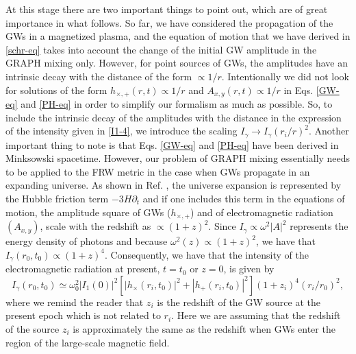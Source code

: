 \documentclass[a4paper,11pt]{article}
\begin{document}
At this stage there are two important things to point out, which are of great importance in what follows. So far, we have considered the propagation of the GWs in a magnetized plasma, and the equation of motion that we have derived in \eqref{schr-eq} takes into account the change of the initial GW amplitude in the GRAPH mixing only. However, for point sources of GWs, the amplitudes have an intrinsic decay with the distance of the form $\propto 1/r$. Intentionally we did not look for solutions of the form $h_{\times, +}(r, t)\propto 1/r$ and $A_{x, y}(r, t)\propto 1/r$ in Eqs. \eqref{GW-eq} and \eqref{PH-eq} in order to simplify our formalism as much as possible. So,  to include the intrinsic decay of the amplitudes with the distance in the expression of the intensity given in \eqref{I1-4}, we introduce the scaling $I_\gamma\rightarrow I_\gamma (r_i/r)^2$. Another important thing to note is that Eqs. \eqref{GW-eq} and \eqref{PH-eq} have been derived in  Minksowski spacetime. However, our problem of GRAPH mixing essentially needs to be applied to the FRW metric in the case when GWs propagate in an expanding universe. As shown in Ref. \cite{Ejlli:2016avx}, the universe expansion is represented by the Hubble friction term $-3 H\partial_t$ and if one includes this term in the equations of motion, the amplitude square of GWs ($h_{\times, +}$) and of electromagnetic radiation $(A_{x, y})$, scale with the redshift as $\propto (1+z)^{2}$. Since $I_\gamma\propto \omega^2 |A|^2$ represents the energy density of photons and because $\omega^2(z) \propto (1+z)^2$, we have that $I_\gamma(r_0, t_0) \propto (1+z)^4$. Consequently, we have that the intensity of the electromagnetic radiation at present, $t=t_0$ or $z=0$, is given by 
\begin{equation}\label{I1-5}
I_\gamma(r_0, t_0) \simeq \omega_0^2 |I_1(0)|^2 \left[  | h_\times(r_i, t_0)|^2 + | h_+(r_i, t_0)|^2 \right](1+z_i)^4(r_i/r_0)^2,
\end{equation}
where we remind the reader that $z_i$ is the redshift of the GW source at the present epoch which is not related to $r_i$. Here we are assuming that the redshift of the source $z_i$ is approximately the same as the redshift when GWs enter the region of the large-scale magnetic field. 
\end{document}
